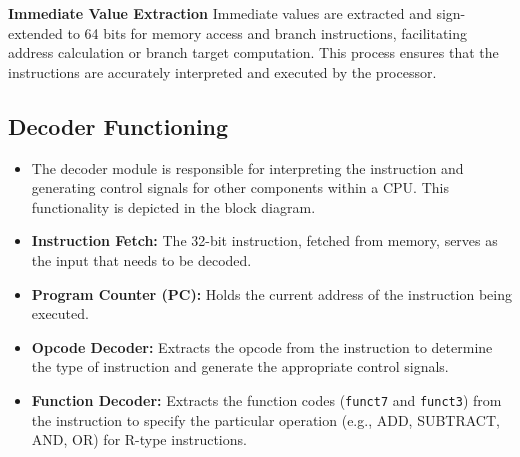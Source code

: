\textbf{Immediate Value Extraction}
Immediate values are extracted and sign-extended to 64 bits for memory access and branch instructions, facilitating address calculation or branch target computation. This process ensures that the instructions are accurately interpreted and executed by the processor.


\subsection{Decoder Functioning}


\begin{itemize}
    \item The decoder module is responsible for interpreting the instruction and generating control signals for other components within a CPU. This functionality is depicted in the block diagram.
    \item \textbf{Instruction Fetch:} The 32-bit instruction, fetched from memory, serves as the input that needs to be decoded.
    \item \textbf{Program Counter (PC):} Holds the current address of the instruction being executed.
    \item \textbf{Opcode Decoder:} Extracts the opcode from the instruction to determine the type of instruction and generate the appropriate control signals.
     \item \textbf{Function Decoder:} Extracts the function codes (\texttt{funct7} and \texttt{funct3}) from the instruction to specify the particular operation (e.g., ADD, SUBTRACT, AND, OR) for R-type instructions.
    

\end{itemize}
